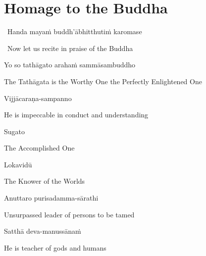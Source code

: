 \section{Homage to the Buddha}
\label{homage-buddha}

\begin{leader}
  \anglebracketleft\ \hspace{-0.5mm}Handa mayaṁ buddh'ābhitthutiṁ karomase \hspace{-0.5mm}\anglebracketright\
\end{leader}
\begin{leader-english-below-pali}
  \anglebracketleft\ \hspace{-0.5mm}Now let us recite in praise of the Buddha \hspace{-0.5mm}\anglebracketright\
\end{leader-english-below-pali}

Yo so tathāgato arahaṁ sammāsambuddho

\begin{english-hang}
  The Tathāgata is the Worthy One the Perfectly Enlightened One
\end{english-hang}

Vijjācaraṇa-sampanno

\begin{english}
  He is impeccable in conduct and understanding
\end{english}

Sugato

\begin{english}
  The Accomplished One
\end{english}

Lokavidū

\begin{english}
  The Knower of the Worlds
\end{english}

Anuttaro purisadamma-sārathi

\begin{english}
  Unsurpassed leader of persons to be tamed\ifdigital\makeatletter\hyperlink{endnote3-appendix}\makeatother\fi
\end{english}

Satthā deva-manussānaṁ

\begin{english}
  He is teacher of gods and humans
\end{english}

